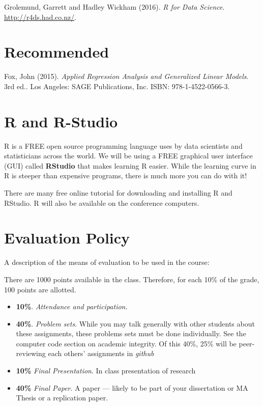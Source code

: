 \documentclass[11pt,]{article}
\begin{document}
 Grolemund, Garrett and Hadley Wickham (2016).
\emph{R for Data Science}. \url{http://r4ds.had.co.nz/}.

\section{Recommended}\label{recommended}

 Fox, John (2015).
\emph{Applied Regression Analysis and Generalized
Linear Models}. 3rd ed.. Los Angeles: SAGE Publications, Inc. ISBN:
978-1-4522-0566-3.

\section{R and R-Studio}\label{r-and-r-studio}

R is a FREE open source programming language uses by data scientists and
statisticians across the world. We will be using a FREE graphical user
interface (GUI) called \textbf{RStudio} that makes learning R easier.
While the learning curve in R is steeper than expensive programs, there
is much more you can do with it!

There are many free online tutorial for downloading and installing R and
RStudio. R will also be available on the conference computers.

\section{Evaluation Policy}\label{evaluation-policy}

A description of the means of evaluation to be used in the course:

There are 1000 points available in the class. Therefore, for each 10\%
of the grade, 100 points are allotted.

\begin{itemize}
\item
  \textbf{10\%}. \emph{Attendance and participation.}
\item
  \textbf{40\%}. \emph{Problem sets}. While you may talk generally with
  other students about these assignments, these problems sets must be
  done individually. See the computer code section on academic
  integrity. Of this 40\%, 25\% will be peer-reviewing each others'
  assignments in \emph{github}
\item
  \textbf{10\%} \emph{Final Presentation}. In class presentation of
  research
\item
  \textbf{40\%} \emph{Final Paper}. A paper --- likely to be part of
  your dissertation or MA Thesis or a replication paper.
\end{itemize}
\end{document}

